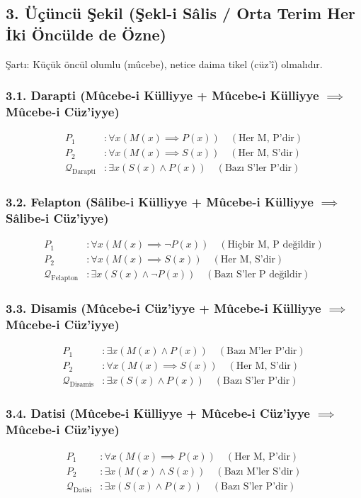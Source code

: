 \documentclass[11pt, a4paper]{article}
\begin{document}
\subsection{3. Üçüncü Şekil (Şekl-i Sâlis / Orta Terim Her İki Öncülde de Özne)}
Şartı: Küçük öncül olumlu (mûcebe), netice daima tikel (cüz'î) olmalıdır.

\subsubsection{3.1. Darapti (Mûcebe-i Külliyye + Mûcebe-i Külliyye $\implies$ Mûcebe-i Cüz'iyye)}
\begin{align}
P_1 &: \forall x (M(x) \implies P(x)) \quad (\text{Her M, P'dir}) \\
P_2 &: \forall x (M(x) \implies S(x)) \quad (\text{Her M, S'dir}) \\
\mathcal{Q}_{\text{Darapti}} &: \exists x (S(x) \land P(x)) \quad (\text{Bazı S'ler P'dir})
\end{align}

\subsubsection{3.2. Felapton (Sâlibe-i Külliyye + Mûcebe-i Külliyye $\implies$ Sâlibe-i Cüz'iyye)}
\begin{align}
P_1 &: \forall x (M(x) \implies \neg P(x)) \quad (\text{Hiçbir M, P değildir}) \\
P_2 &: \forall x (M(x) \implies S(x)) \quad (\text{Her M, S'dir}) \\
\mathcal{Q}_{\text{Felapton}} &: \exists x (S(x) \land \neg P(x)) \quad (\text{Bazı S'ler P değildir})
\end{align}

\subsubsection{3.3. Disamis (Mûcebe-i Cüz'iyye + Mûcebe-i Külliyye $\implies$ Mûcebe-i Cüz'iyye)}
\begin{align}
P_1 &: \exists x (M(x) \land P(x)) \quad (\text{Bazı M'ler P'dir}) \\
P_2 &: \forall x (M(x) \implies S(x)) \quad (\text{Her M, S'dir}) \\
\mathcal{Q}_{\text{Disamis}} &: \exists x (S(x) \land P(x)) \quad (\text{Bazı S'ler P'dir})
\end{align}

\subsubsection{3.4. Datisi (Mûcebe-i Külliyye + Mûcebe-i Cüz'iyye $\implies$ Mûcebe-i Cüz'iyye)}
\begin{align}
P_1 &: \forall x (M(x) \implies P(x)) \quad (\text{Her M, P'dir}) \\
P_2 &: \exists x (M(x) \land S(x)) \quad (\text{Bazı M'ler S'dir}) \\
\mathcal{Q}_{\text{Datisi}} &: \exists x (S(x) \land P(x)) \quad (\text{Bazı S'ler P'dir})
\end{align}
\end{document}
